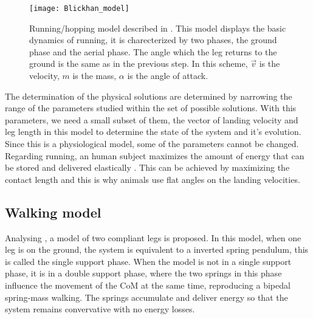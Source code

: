 \begin{figure}[H]
  \centering
  \texttt{[image: Blickhan\_model]}
  \caption{Running/hopping model described in \cite{Blickhan1989}. This model displays the basic dynamics of running, it is charecterized by two phases, the ground phase and the aerial phase. The angle which the leg returns to the ground is the same as in the previous step. In this scheme, $\vec{v}$ is the velocity, $m$ is the mass, $\alpha$ is the angle of attack. }
  \label{blickhan_model}
 \end{figure}

\noindent The determination of the physical solutions are determined by narrowing the range of the parameters studied within the set of possible solutions. With this parameters, we need a small subset of them, the vector of landing velocity and leg length in this model to determine the state of the system and it's evolution. Since this is a physiological model, some of the parameters cannot be changed. Regarding running, an human subject maximizes the amount of energy that can be stored and delivered elastically \cite{Blickhan1989}. This can be achieved by maximizing the contact length and this is why animals use flat angles on the landing velocities.

\subsection{Walking model}\label{walkingmodel}

Analysing \cite{Seyfarth2006}, a model of two compliant legs is proposed. In this model, when one leg is on the ground, the system is equivalent to a inverted spring pendulum, this is called the single support phase. When the model is not in a single support phase, it is in a double support phase, where the two springs in this phase influence the movement of the CoM at the same time, reproducing a bipedal spring-mass walking. The springs accumulate and deliver energy so that the system remains convervative with no energy losses.

